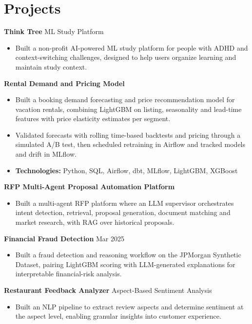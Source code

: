 \documentclass[10pt,a4paper]{article}
\begin{document}
\section{Projects}
\textbf{Think Tree} \textbar{} ML Study Platform\par
\begin{itemize}
  \item Built a non-profit AI-powered ML study platform for people with ADHD and context-switching challenges, designed to help users organize learning and maintain study context.
\end{itemize}
\textbf{Rental Demand and Pricing Model}\par
\begin{itemize}
  \item Built a booking demand forecasting and price recommendation model for vacation rentals, combining LightGBM on listing, seasonality and lead-time features with price elasticity estimates per segment.
  \item Validated forecasts with rolling time-based backtests and pricing through a simulated A/B test, then scheduled retraining in Airflow and tracked models and drift in MLflow.
  \item \textbf{Technologies:} Python, SQL, Airflow, dbt, MLflow, LightGBM, XGBoost
\end{itemize}
\textbf{RFP Multi-Agent Proposal Automation Platform}\par
\begin{itemize}
  \item Built a multi-agent RFP platform where an LLM supervisor orchestrates intent detection, retrieval, proposal generation, document matching and market research, with RAG over historical proposals.
\end{itemize}
\textbf{Financial Fraud Detection} \textbar{} Mar 2025\par
\begin{itemize}
  \item Built a fraud detection and reasoning workflow on the JPMorgan Synthetic Dataset, pairing LightGBM scoring with LLM-generated explanations for interpretable financial-risk analysis.
\end{itemize}
\textbf{Restaurant Feedback Analyzer} \textbar{} Aspect-Based Sentiment Analysis\par
\begin{itemize}
  \item Built an NLP pipeline to extract review aspects and determine sentiment at the aspect level, enabling granular insights into customer experience.
\end{itemize}
\end{document}
